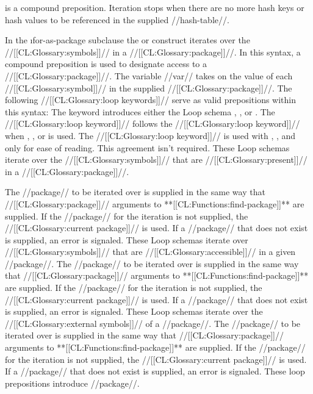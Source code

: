 is a compound preposition.
  Iteration stops when there are no more hash keys or hash values to be referenced in the supplied //hash-table//.

\endsubsubsubsection%


In the \i{for-as-package} subclause the   or  construct                     iterates over the //[[CL:Glossary:symbols]]// in a //[[CL:Glossary:package]]//. In this syntax, a compound preposition is used to designate access to a //[[CL:Glossary:package]]//. The variable //var// takes on the value of each //[[CL:Glossary:symbol]]// in the supplied //[[CL:Glossary:package]]//.  
 The following //[[CL:Glossary:loop keywords]]// serve as valid prepositions within this syntax:
  \beginlist
  The keyword  introduces either the Loop schema  , ,  or .
  The //[[CL:Glossary:loop keyword]]//  follows the //[[CL:Glossary:loop keyword]]//  when ,  , or  is used.   The //[[CL:Glossary:loop keyword]]//  is used with ,  , and  only for ease of reading. This agreement isn't required.
  These Loop schemas iterate over the //[[CL:Glossary:symbols]]//   that are //[[CL:Glossary:present]]// in a //[[CL:Glossary:package]]//.

The //package// to be iterated over is supplied in the same way that //[[CL:Glossary:package]]// arguments to **[[CL:Functions:find-package]]** are supplied.   If the //package// for the iteration is not supplied,  the //[[CL:Glossary:current package]]// is used.   If a //package// that does not exist is supplied,  an error  is signaled.
  These Loop schemas iterate over //[[CL:Glossary:symbols]]// that are //[[CL:Glossary:accessible]]// in a given //package//.   The //package// to be iterated over is supplied in the same way that //[[CL:Glossary:package]]// arguments to **[[CL:Functions:find-package]]** are supplied. If the //package// for the iteration is not supplied,  the //[[CL:Glossary:current package]]// is used. If a //package// that does not exist is supplied,  an error  is signaled.
  These Loop schemas iterate over the //[[CL:Glossary:external symbols]]// of a //package//. The //package// to be iterated over is supplied in the same way that //[[CL:Glossary:package]]// arguments to **[[CL:Functions:find-package]]** are supplied. If the //package// for the iteration is not supplied,  the //[[CL:Glossary:current package]]// is used. If a //package// that does not exist is supplied,  an error  is signaled.
  These loop prepositions introduce //package//.
  \endlist

